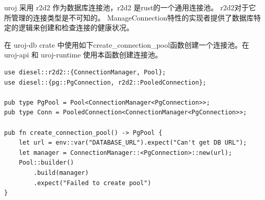 uroj 采用 r2d2 作为数据库连接池，r2d2 是rust的一个通用连接池。
r2d2对于它所管理的连接类型是不可知的。
ManageConnection特性的实现者提供了数据库特定的逻辑来创建和检查连接的健康状况。

在 uroj-db crate 中使用如下create\_connection\_pool函数创建一个连接池。在
uroj-api 和 uroj-runtime 使用本函数创建连接池。
\begin{lstlisting}
use diesel::r2d2::{ConnectionManager, Pool};
use diesel::{pg::PgConnection, r2d2::PooledConnection};

pub type PgPool = Pool<ConnectionManager<PgConnection>>;
pub type Conn = PooledConnection<ConnectionManager<PgConnection>>;

pub fn create_connection_pool() -> PgPool {
    let url = env::var("DATABASE_URL").expect("Can't get DB URL");
    let manager = ConnectionManager::<PgConnection>::new(url);
    Pool::builder()
        .build(manager)
        .expect("Failed to create pool")
}
\end{lstlisting}